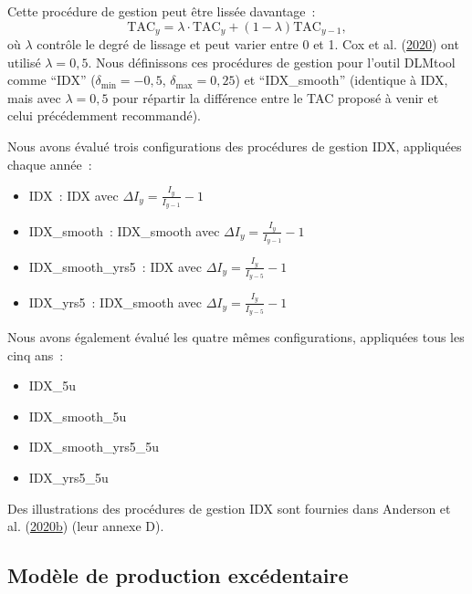\documentclass[french,11pt]{book}
\begin{document}
Cette procédure de gestion peut être lissée davantage~:
\begin{equation}
\textrm{TAC}_y = \lambda \cdot \textrm{TAC}_y + (1-\lambda) \textrm{TAC}_{y-1},
\end{equation}
où \(\lambda\) contrôle le degré de lissage et peut varier entre 0 et 1. Cox et al. (\protect\hyperlink{ref-cox2020}{2020}) ont utilisé \(\lambda=0,5\). Nous définissons ces procédures de gestion pour l'outil DLMtool comme ``IDX'' (\(\delta_{\textrm{min}} = -0,5\), \(\delta_{\textrm{max}} = 0,25\)) et ``IDX\_smooth'' (identique à IDX, mais avec \(\lambda = 0,5\) pour répartir la différence entre le TAC proposé à venir et celui précédemment recommandé).

Nous avons évalué trois configurations des procédures de gestion IDX, appliquées chaque année~:
\begin{itemize}
\item
  IDX~: IDX avec \(\Delta I_y = \frac{I_y}{I_{y-1}} -1\)
\item
  IDX\_smooth~: IDX\_smooth avec \(\Delta I_y = \frac{I_y}{I_{y-1}} -1\)
\item
  IDX\_smooth\_yrs5~: IDX avec \(\Delta I_y = \frac{I_y}{I_{y-5}} -1\)
\item
  IDX\_yrs5~: IDX\_smooth avec \(\Delta I_y = \frac{I_y}{I_{y-5}} -1\)
\end{itemize}
Nous avons également évalué les quatre mêmes configurations, appliquées tous les cinq ans~:
\begin{itemize}
\item
  IDX\_5u
\item
  IDX\_smooth\_5u
\item
  IDX\_smooth\_yrs5\_5u
\item
  IDX\_yrs5\_5u
\end{itemize}
Des illustrations des procédures de gestion IDX sont fournies dans Anderson et al. (\protect\hyperlink{ref-anderson2020gfmp}{2020}\protect\hyperlink{ref-anderson2020gfmp}{b}) (leur annexe D).

\hypertarget{sec:mp-model-based}{%
\label{sec:mp-model-based}}

\hypertarget{sec:mp-sp}{%
\subsection{Modèle de production excédentaire}\label{sec:mp-sp}}
\end{document}
